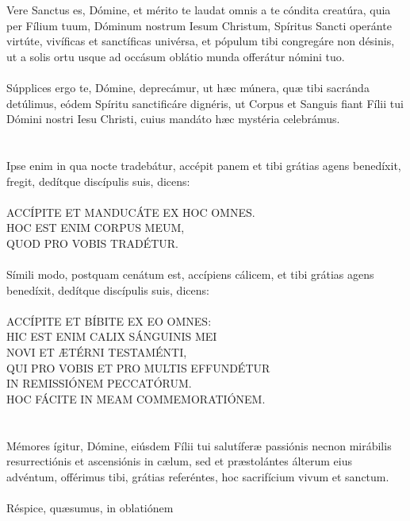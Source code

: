 \documentclass[12pt, a4paper]{article}
\begin{document}
	Vere Sanctus es, Dómine,
	et mérito te laudat omnis a te
	cóndita creatúra, quia per Fílium
	tuum, Dóminum nostrum Iesum
	Christum, Spíritus Sancti operánte
	virtúte, vivíficas et sanctíficas
	univérsa, et pópulum tibi
	congregáre non désinis, ut a solis
	ortu usque ad occásum oblátio
	munda offerátur nómini tuo.
	\\\\
	Súpplices ergo te, Dómine,
	deprecámur, ut hæc múnera, quæ
	tibi sacránda detúlimus, eódem
	Spíritu sanctificáre dignéris, ut
	Corpus et Sanguis fiant Fílii tui
	Dómini nostri Iesu Christi, cuius
	mandáto hæc mystéria celebrámus.
	\\\\
	\\
	Ipse enim in qua nocte tradebátur,
	accépit panem et tibi grátias agens
	benedíxit, fregit, dedítque discípulis
	suis, dicens:
	\\\\
	ACCÍPITE ET MANDUCÁTE EX HOC
	OMNES.
	\\
	HOC EST ENIM CORPUS MEUM,
	\\
	QUOD PRO VOBIS TRADÉTUR.
	\\\\
	Símili modo, postquam cenátum
	est, accípiens cálicem, et tibi grátias
	agens benedíxit, dedítque discípulis
	suis, dicens:
	\\\\
	ACCÍPITE ET BÍBITE EX EO OMNES:
	\\
	HIC EST ENIM CALIX SÁNGUINIS MEI
	\\
	NOVI ET ÆTÉRNI TESTAMÉNTI,
	\\
	QUI PRO VOBIS ET PRO MULTIS EFFUNDÉTUR
	\\
	IN REMISSIÓNEM PECCATÓRUM.
	\\
	HOC FÁCITE IN MEAM COMMEMORATIÓNEM.
	\\\\
	\\
	Mémores ígitur, Dómine, eiúsdem
	Fílii tui salutíferæ passiónis necnon
	mirábilis resurrectiónis et
	ascensiónis in cælum, sed et
	præstolántes álterum eius
	advéntum, offérimus tibi, grátias
	referéntes, hoc sacrifícium vivum et
	sanctum.
	\\\\
	Réspice, quæsumus, in oblatiónem
\end{document}
